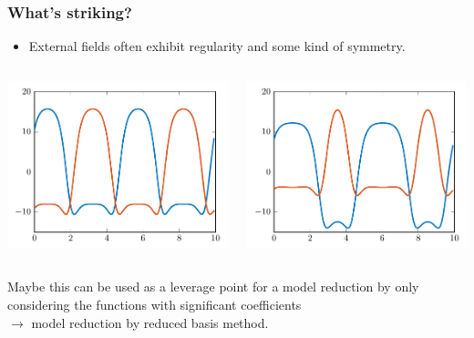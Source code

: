 \begin{frame}[t]
    \frametitle{What's striking?}

    \begin{itemize}
        \item External fields often exhibit regularity and some kind of symmetry.
    \end{itemize}

    \vfill

    \begin{columns}
        \begin{column}{0.5\textwidth}
            \includegraphics[width=\textwidth]{figures/scft1.pdf}
        \end{column}
        \begin{column}{0.5\textwidth}
            \includegraphics[width=\textwidth]{figures/scft_example2_fields.pdf}
        \end{column}
    \end{columns}

    Maybe this can be used as a leverage point for a model reduction by only considering the functions with significant coefficients\\
    $\rightarrow$ model reduction by reduced basis method.
\end{frame}


